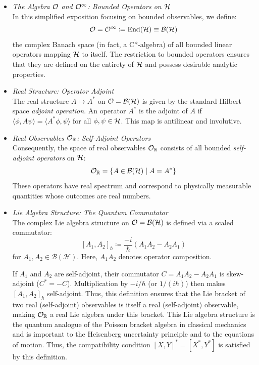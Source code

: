 \begin{itemize}
\item \textit{The Algebra $\mathcal{O}$ and $\mathcal{O}^\infty$: Bounded Operators on $\mathcal{H}$}\\
In this simplified exposition focusing on bounded observables, we define:
\[ \mathcal{O} = \mathcal{O}^\infty \coloneqq \text{End}(\mathcal{H}) \equiv \mathcal{B}(\mathcal{H}) \]
the complex Banach space (in fact, a C*-algebra) of all bounded linear operators mapping $\mathcal{H}$ to itself. The restriction to bounded operators ensures that they are defined on the entirety of $\mathcal{H}$ and possess desirable analytic properties.

\item \textit{Real Structure: Operator Adjoint}\\
The real structure $A \mapsto A^*$ on $\mathcal{O} = \mathcal{B}(\mathcal{H})$ is given by the standard Hilbert space \textit{adjoint operation}. An operator $A^*$ is the adjoint of $A$ if $\langle\phi, A\psi\rangle = \langle A^*\phi, \psi\rangle$ for all $\phi, \psi \in \mathcal{H}$. This map is antilinear and involutive.

\item \textit{Real Observables $\mathcal{O}_{\mathbb{R}}$: Self-Adjoint Operators}\\
Consequently, the space of real observables $\mathcal{O}_{\mathbb{R}}$ consists of all bounded \textit{self-adjoint operators} on $\mathcal{H}$:
\[ \mathcal{O}_{\mathbb{R}} = \{ A \in \mathcal{B}(\mathcal{H}) \mid A = A^* \} \]
These operators have real spectrum and correspond to physically measurable quantities whose outcomes are real numbers.

\item \textit{Lie Algebra Structure: The Quantum Commutator}\\
The complex Lie algebra structure on $\mathcal{O} = \mathcal{B}(\mathcal{H})$ is defined via a scaled commutator:
\[ [A_1, A_2]_\hbar \coloneqq \frac{-i}{\hbar} (A_1 A_2 - A_2 A_1)  \]
for $A_1, A_2 \in \mathcal{B}(\mathcal{H})$. Here, $A_1 A_2$ denotes operator composition.

If $A_1$ and $A_2$ are self-adjoint, their commutator $C = A_1 A_2 - A_2 A_1$ is skew-adjoint ($C^* = -C$). Multiplication by $-i/\hbar$ (or $1/(i\hbar)$) then makes $[A_1, A_2]_\hbar$ self-adjoint. Thus, this definition ensures that the Lie bracket of two real (self-adjoint) observables is itself a real (self-adjoint) observable, making $\mathcal{O}_{\mathbb{R}}$ a real Lie algebra under this bracket. This Lie algebra structure is the quantum analogue of the Poisson bracket algebra in classical mechanics and is important to the Heisenberg uncertainty principle and to the equations of motion. Thus, the compatibility condition $[X,Y]^* = [X^*,Y^*]$ is satisfied by this definition.



\end{itemize}
